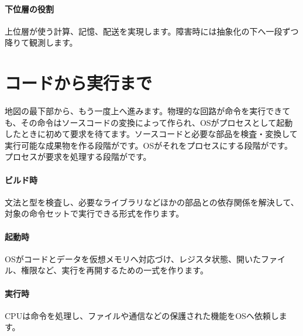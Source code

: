 \par
\endgroup
\medskip
\begingroup
\paragraph{下位層の役割}
        上位層が使う計算、記憶、配送を実現します。障害時には抽象化の下へ一段ずつ降りて観測します。

\par
\endgroup
\par
\endgroup


\section{コードから実行まで}
\label{sec:07-practice-02}

地図の最下部から、もう一度上へ進みます。物理的な回路が命令を実行できても、その命令はソースコードの変換によって作られ、OSがプロセスとして起動したときに初めて要求を待てます。ソースコードと必要な部品を検査・変換して実行可能な成果物を作る段階がです。OSがそれをプロセスにする段階がです。プロセスが要求を処理する段階がです。

\begingroup
  \centering
  \vspace{5mm}
\begingroup
\paragraph{ビルド時}
        文法と型を検査し、必要なライブラリなどほかの部品との依存関係を解決して、対象の命令セットで実行できる形式を作ります。

\par
\endgroup
\medskip
\begingroup
\paragraph{起動時}
        OSがコードとデータを仮想メモリへ対応づけ、レジスタ状態、開いたファイル、権限など、実行を再開するための一式を作ります。

\par
\endgroup
\medskip
\begingroup
\paragraph{実行時}
        CPUは命令を処理し、ファイルや通信などの保護された機能をOSへ依頼します。

\par
\endgroup
\par
\endgroup


